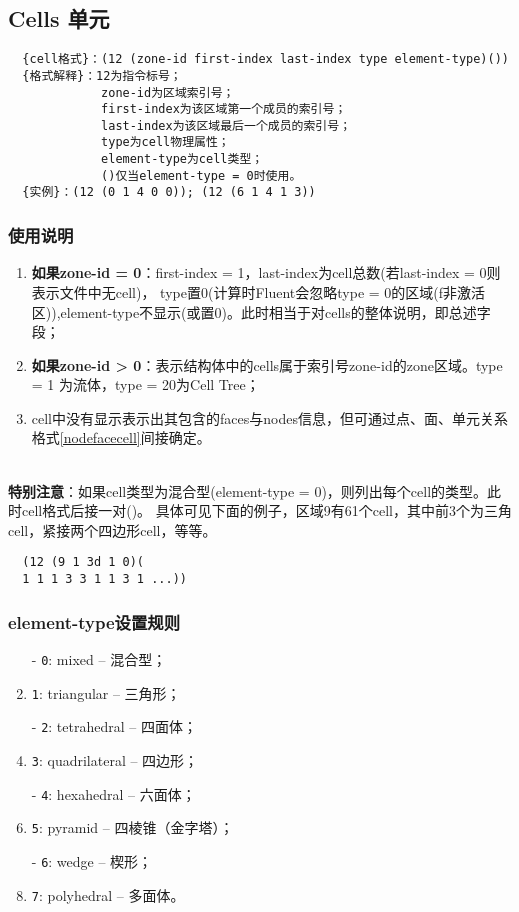 \documentclass[lang=cn,11pt,a4paper]{elegantpaper} %
\begin{document}
\subsection{Cells 单元}\label{Cells}
\begin{lstlisting}
  {cell格式}：(12 (zone-id first-index last-index type element-type)())
  {格式解释}：12为指令标号；
             zone-id为区域索引号；
             first-index为该区域第一个成员的索引号；
             last-index为该区域最后一个成员的索引号；
             type为cell物理属性；
             element-type为cell类型；
             ()仅当element-type = 0时使用。
  {实例}：(12 (0 1 4 0 0)); (12 (6 1 4 1 3))
\end{lstlisting}

\subsubsection{使用说明}
\begin{enumerate}
  \item \textbf{如果zone-id = 0}：first-index = 1，last-index为cell总数(若last-index = 0则表示文件中无cell)，
                                  type置0(计算时Fluent会忽略type = 0的区域(f非激活区)),element-type不显示(或置0)。此时相当于对cells的整体说明，即总述字段；
  \item \textbf{如果zone-id > 0}：表示结构体中的cells属于索引号zone-id的zone区域。type = 1 为流体，type = 20为Cell Tree；
  \item cell中没有显示表示出其包含的faces与nodes信息，但可通过点、面、单元关系格式\ref{nodefacecell}间接确定。
\end{enumerate}
~\\
\textbf{特别注意}：如果cell类型为混合型(element-type = 0)，则列出每个cell的类型。此时cell格式后接一对()。
具体可见下面的例子，区域9有61个cell，其中前3个为三角cell，紧接两个四边形cell，等等。
\begin{lstlisting}
  (12 (9 1 3d 1 0)(
  1 1 1 3 3 1 1 3 1 ...))
\end{lstlisting}

\subsubsection{element-type设置规则}\label{element-type}
\begin{enumerate}
  \item[-] \lstinline{0}: mixed -- 混合型；
  \item[-] \lstinline{1}: triangular -- 三角形；
  \item[-] \lstinline{2}: tetrahedral -- 四面体；
  \item[-] \lstinline{3}: quadrilateral -- 四边形；
  \item[-] \lstinline{4}: hexahedral -- 六面体；
  \item[-] \lstinline{5}: pyramid -- 四棱锥（金字塔）；
  \item[-] \lstinline{6}: wedge -- 楔形；
  \item[-] \lstinline{7}: polyhedral -- 多面体。
\end{enumerate}
\end{document}
